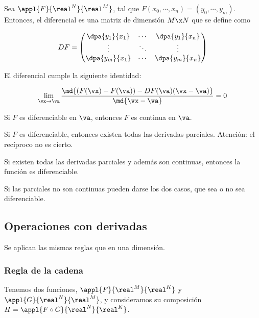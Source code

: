 \documentclass[12pt,a4paper,titlepage]{apuntes}
\begin{document}
\begin{defn}[Diferencial]
Sea $\appl{F}{\real^N}{\real^M}$, tal que $F(x_0,\cdots,x_n) = (y_0, \cdots, y_m)$. Entonces, el diferencial es una matriz de dimensión $M\x N$ que se define como

\[ DF = \left( \begin{matrix} \dpa{y_1}{x_1} & \cdots &\dpa{y_1}{x_n} \\
\vdots & \ddots & \vdots \\
\dpa{y_m}{x_1} & \cdots & \dpa{y_m}{x_n} \end{matrix}\right) \]

El diferencial cumple la siguiente identidad: 

\[ \lim_{\vx\to\va} \frac{\md{(F(\vx) - F(\va)) - DF(\va)(\vx-\va)}}{\md{\vx-\va}} = 0 \]
\end{defn}

\begin{theorem}
Si $F$ es diferenciable en $\va$, entonces $F$ es continua en $\va$.
\end{theorem}

\begin{theorem}
Si $F$ es diferenciable, entonces existen todas las derivadas parciales. Atención: el recíproco no es cierto.
\end{theorem}

\begin{theorem}
Si existen todas las derivadas parciales y además son continuas, entonces la función es diferenciable.
\end{theorem}

\begin{remark}
Si las parciales no son continuas pueden darse los dos casos, que sea o no sea diferenciable.
\end{remark}

\subsection{Operaciones con derivadas}

Se aplican las mismas reglas que en una dimensión.

\subsubsection{Regla de la cadena}

Tenemos dos funciones, $\appl{F}{\real^M}{\real^K}$ y $\appl{G}{\real^N}{\real^M}$, y consideramos su composición $H=\appl{F\circ G}{\real^N}{\real^K}$.
\end{document}
